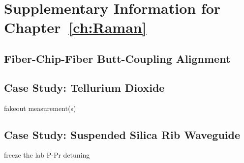 \chapter{Supplementary Information for Chapter~\ref{ch:Raman}}
\label{appendix: Raman}
\acresetall

\section{Fiber-Chip-Fiber Butt-Coupling Alignment}
\label{Raman:Appendix:sec:Alignment}


\section{Case Study: Tellurium Dioxide}
\label{Raman:Appendix:sec:CaseStudyTeO2}
fakeout measurement(s)

\section{Case Study: Suspended Silica Rib Waveguide}
\label{Raman:Appendix:sec:CaseStudyWaveguide}
freeze the lab
P-Pr detuning
